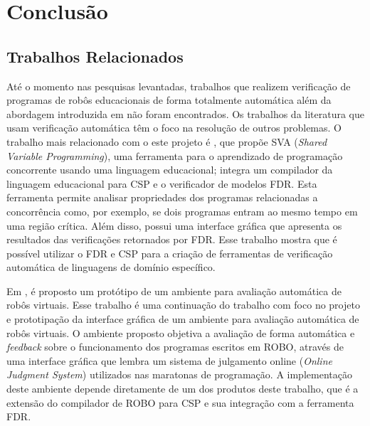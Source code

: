\chapter{Conclusão}
\label{chap:cap5}

\section{Trabalhos Relacionados}

Até o momento nas pesquisas levantadas, trabalhos que realizem verificação de programas de robôs educacionais de forma totalmente automática além da abordagem introduzida em \cite{nogueira} não foram encontrados. Os trabalhos da literatura que usam verificação automática têm o foco na resolução de outros problemas. O trabalho mais relacionado com o este projeto é \cite{SVA}, que propõe SVA (\textit{Shared Variable Programming}), uma ferramenta para o aprendizado de programação concorrente usando uma linguagem educacional; integra um compilador da linguagem educacional para CSP e o verificador de modelos FDR. Esta ferramenta permite analisar propriedades dos programas relacionadas a concorrência como, por exemplo, se dois programas entram ao mesmo tempo em uma região crítica. Além disso, possui uma interface gráfica que apresenta os resultados das verificações retornados por FDR. Esse trabalho mostra que é possível utilizar o FDR e CSP para a criação de ferramentas de verificação automática de linguagens de domínio específico. 

Em \cite{emanuel2017}, é proposto um protótipo de um ambiente para avaliação automática de robôs virtuais. Esse trabalho é uma continuação do trabalho \cite{nogueira} com foco no projeto e prototipação da interface gráfica de um ambiente para avaliação automática de robôs virtuais. O ambiente proposto objetiva a avaliação de forma automática e \textit{feedback} sobre o funcionamento dos programas escritos em ROBO, através de uma interface gráfica que lembra um sistema de julgamento online (\textit{Online Judgment System}) utilizados nas maratonas de programação. A implementação deste ambiente depende diretamente de um dos produtos deste trabalho, que é a extensão do compilador de ROBO para CSP e sua integração com a ferramenta FDR.

